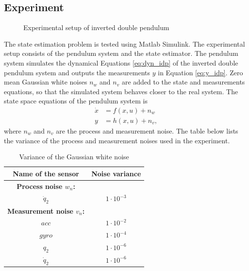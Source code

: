 \subsection{Experiment}
\begin{figure}[h]
    \centering
    
    \caption{Experimental setup of inverted double pendulum}
    \label{fig:exp_idp}  
\end{figure}

The state estimation problem is tested using Matlab Simulink. The experimental setup consists of the pendulum system and the state estimator. The pendulum system simulates the dynamical Equations \ref{eq:dyn_idp} of the inverted double pendulum system and outputs the measurements $y$ in Equation \ref{eq:y_idp}. Zero mean Gaussian white noises $n_w$ and $n_v$ are added to the state and measurements equations, so that the simulated system behaves closer to the real system. The state space equations of the pendulum system is 
\begin{equation}
    \label{eq:sim_idp}
    \begin{split}
    \dot x &= f(x,u) + n_w \\
    y &= h(x,u) + n_v,
    \end{split}
\end{equation}
where $n_w$ and $n_v$ are the process and measurement noise. The table below lists the variance of the process and measurement noises used in the experiment.
\begin{table}[H]
    \centering
    \begin{tabular}{|c|c|}
    \hline
    Name of the sensor &Noise variance\\ \hline
    \textbf{Process noise $w_n$:}&\hspace{2mm} \\
    $\dot q_2$ &$1\cdot{10}^{-3}$ \\ \hline
    \textbf{Measurement noise $v_n$:}&\hspace{2mm} \\
     $acc$ &$1\cdot{10}^{-2}$ \\
     $gyro$ &$1\cdot{10}^{-4}$ \\
     $q_2$ &$1\cdot{10}^{-6}$\\ 
     $\dot q_2$ &$1\cdot{10}^{-6}$ \\ \hline
    \end{tabular}
    \caption{ Variance of the Gaussian white noise}
    \label{tab:idp_noise}
\end{table}

